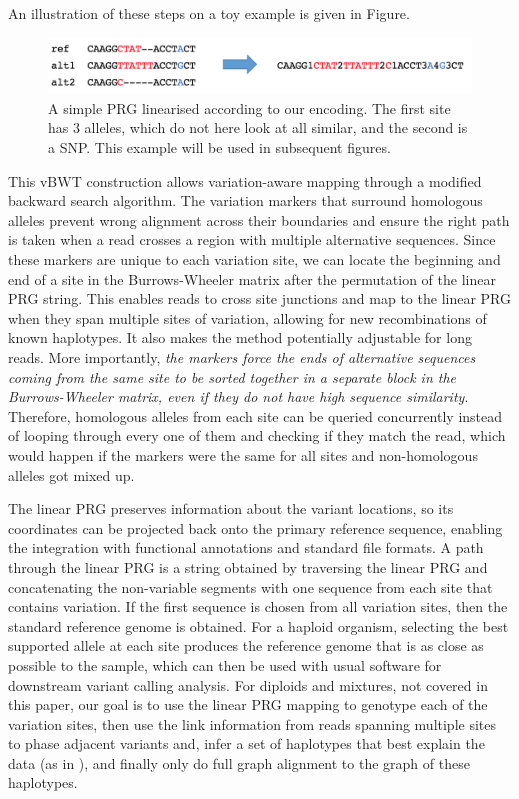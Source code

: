 \documentclass[runningheads,a4paper]{llncs}
\begin{document}
An illustration of these steps on a toy example is given in Figure.

\begin{figure}
\centering
\includegraphics[height=1.5cm]{linPRG}
\caption{A simple PRG linearised according to our encoding. The first site has 3 alleles, which do not here look at all similar, and the second is a SNP. This example will be used in subsequent figures.}
\label{lab}
\end{figure}


This vBWT construction allows variation-aware mapping through a modified backward search algorithm. The variation markers that surround homologous alleles prevent wrong alignment across their boundaries and ensure the right path is taken when a read crosses a region with multiple alternative sequences. Since these markers are unique to each variation site, we can locate the beginning and end of a site in the Burrows-Wheeler matrix after the permutation of the linear PRG string. This enables reads to cross site junctions and map to the linear PRG when they span multiple sites of variation, allowing for new recombinations of known haplotypes. It also makes the method potentially adjustable for long reads. More importantly, \textit{the markers force the ends of alternative sequences coming from the same site to be sorted together in a separate block in the Burrows-Wheeler matrix, even if they do not have high sequence similarity}. Therefore, homologous alleles from each site can be queried concurrently instead of looping through every one of them and checking if they match the read, which would happen if the markers were the same for all sites and non-homologous alleles got mixed up. 

The linear PRG preserves information about the variant locations, so its coordinates can be projected back onto the primary reference sequence, enabling the integration with functional annotations and standard file formats. A path through the linear PRG is a string obtained by traversing the linear PRG and concatenating the non-variable segments with one sequence from each site that contains variation. If the first sequence is chosen from all variation sites, then the standard reference genome is obtained. For a haploid organism, selecting the best supported allele at each site produces the reference genome that is as close as possible to the sample, which can then be used with usual software for downstream variant calling analysis. For diploids and mixtures, not covered in this paper, our goal is to use the linear PRG mapping to genotype each of the variation sites, then use the link information from reads spanning multiple sites to phase adjacent variants and, infer a set of haplotypes that best explain the data (as in \cite{dilthey}), and finally only do full graph alignment to the graph of these haplotypes. 
\end{document}
